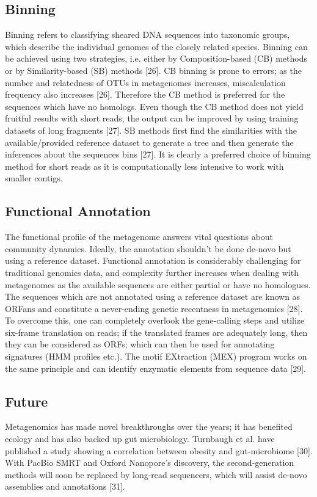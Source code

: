 \subsection{Binning}
Binning refers to classifying sheared DNA sequences into taxonomic groups, which describe the individual genomes of the closely related species. Binning can be achieved using two strategies, i.e. either by Composition-based (CB) methods or by Similarity-based (SB) methods [26]. CB binning is prone to errors; as the number and relatedness of OTUs in metagenomes increases, miscalculation frequency also increases [26]. Therefore the CB method is preferred for the sequences which have no homologs. Even though the CB method does not yield fruitful results with short reads, the output can be improved by using training datasets of long fragments [27]. SB methods first find the similarities with the available/provided reference dataset to generate a tree and then generate the inferences about the sequences bins [27]. It is clearly a preferred choice of binning method for short reads as it is computationally less intensive to work with smaller contigs.

\subsection{Functional Annotation}
The functional profile of the metagenome answers vital questions about community dynamics. Ideally, the annotation shouldn't be done de-novo but using a reference dataset. Functional annotation is considerably challenging for traditional genomics data, and complexity further increases when dealing with metagenomes as the available sequences are either partial or have no homologues. The sequences which are not annotated using a reference dataset are known as ORFans and constitute a never-ending genetic recentness in metagenomics [28]. To overcome this, one can completely overlook the gene-calling steps and utilize six-frame translation on reads; if the translated frames are adequately long, then they can be considered as ORFs; which can then be used for annotating signatures (HMM profiles etc.). The motif EXtraction (MEX) program works on the same principle and can identify enzymatic elements from sequence data [29].

\subsection{Future}
Metagenomics has made novel breakthroughs over the years; it has benefited ecology and has also backed up gut microbiology. Turnbaugh et al. have published a study showing a correlation between obesity and gut-microbiome [30]. With PacBio SMRT and Oxford Nanopore's discovery, the second-generation methods will soon be replaced by long-read sequencers, which will assist de-novo assemblies and annotations [31].